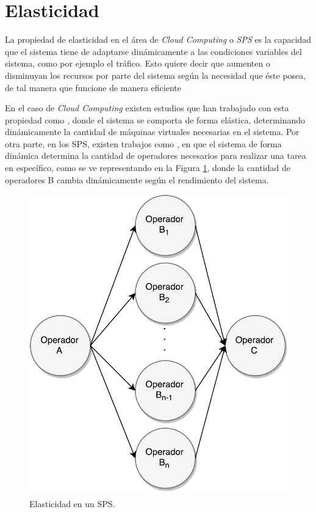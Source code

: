 \section{Elasticidad}
\label{sec:elasticidad}

La propiedad de elasticidad en el área de \textit{Cloud Computing} o \textit{SPS} es la capacidad que el sistema tiene de adaptarse dinámicamente a las condiciones variables del sistema, como por ejemplo el tráfico. \normalsize{Esto quiere decir que aumenten o disminuyan los recursos por parte del sistema según la necesidad que éste posea, de tal manera que funcione de manera eficiente} \citep{kelly2014elasticity}

En el caso de \textit{Cloud Computing} existen estudios que han trabajado con esta propiedad como \citep{GongGW10, NguyenSGSW13, LehrigEB15}, donde el sistema se comporta de forma elástica, determinando dinámicamente la cantidad de máquinas virtuales necesarias en el sistema. Por otra parte, en los SPS, existen trabajos como \citep{GedikSHW14, IshiiS11, SchneiderAGBW09, MadsenTZ14, GulisanoJPSV12}, en que el sistema de forma dinámica determina la cantidad de operadores necesarios para realizar una tarea en específico, como se ve representando en la Figura \ref{fig:elasticidad}, donde la cantidad de operadores B cambia dinámicamente según el rendimiento del sistema.

\begin{figure}[!ht]
	\centering
	\includegraphics[scale=0.55]{images/Elasticidad.pdf}
	\caption{Elasticidad en un SPS.}
	\label{fig:elasticidad}
\end{figure}

